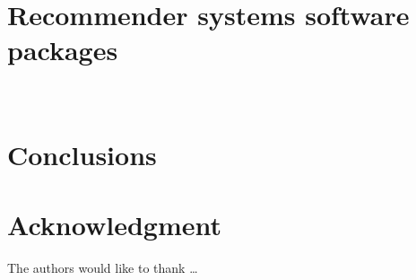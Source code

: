 \section{Recommender systems software packages}~\label{sec:tools}


\section{Conclusions} \label{sec-conclusions}

\blindtext

\section*{Acknowledgment}

\lipsum[1]


The authors would like to thank \ldots

